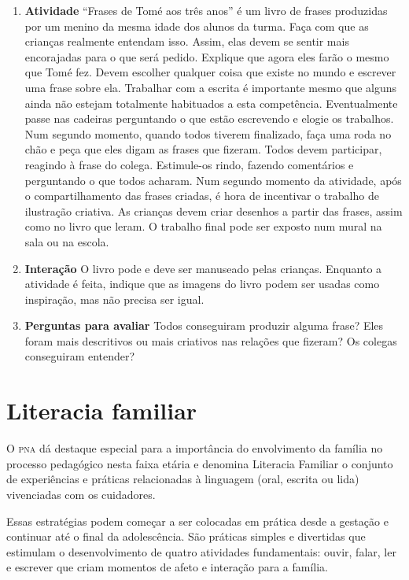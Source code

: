 \documentclass[11pt]{extarticle}
\begin{document}
\begin{enumerate}
\item \textbf{Atividade}\quad 
``Frases de Tomé aos três anos'' é um livro de frases produzidas por
um menino da mesma idade dos alunos da turma. Faça com que as crianças
realmente entendam isso. Assim, elas devem se sentir mais encorajadas para
o que será pedido. 
Explique que agora eles farão o mesmo que Tomé fez.
Devem escolher qualquer coisa que existe no mundo e escrever uma frase
sobre ela. Trabalhar com a escrita é importante mesmo que alguns ainda
não estejam totalmente habituados a esta competência. 
Eventualmente passe nas cadeiras perguntando o que estão escrevendo 
e elogie os trabalhos.
Num segundo momento, quando todos tiverem finalizado, faça uma roda
no chão e peça que eles digam as frases que fizeram. Todos devem participar,
reagindo à frase do colega. Estimule-os rindo, fazendo comentários e perguntando
o que todos acharam. 
Num segundo momento da atividade, após o compartilhamento das frases criadas,
é hora de incentivar o trabalho de ilustração criativa. 
As crianças devem criar desenhos a partir das frases, assim como 
no livro que leram. 
O trabalho final pode ser exposto num mural na sala ou na escola. 

\item \textbf{Interação}\quad 
O livro pode e deve ser manuseado pelas crianças. Enquanto a atividade
é feita, indique que as imagens do livro podem ser usadas como 
inspiração, mas não precisa ser igual. 


\item \textbf{Perguntas para avaliar}\quad
Todos conseguiram produzir alguma frase? Eles foram mais descritivos 
ou mais criativos nas relações que fizeram? Os colegas conseguiram entender? 
\end{enumerate}

\section{Literacia familiar}
O \textsc{pna} dá destaque especial para a importância do envolvimento da família 
no processo pedagógico nesta faixa etária e denomina Literacia Familiar o conjunto 
de experiências e práticas relacionadas à linguagem (oral, escrita ou lida) vivenciadas 
com os cuidadores. 

Essas estratégias podem começar a ser colocadas em prática desde a 
gestação e continuar até o final da adolescência. São práticas simples e divertidas 
que estimulam o desenvolvimento de quatro atividades fundamentais: ouvir, falar, 
ler e escrever que criam momentos de afeto e interação para a família. 
\end{document}
